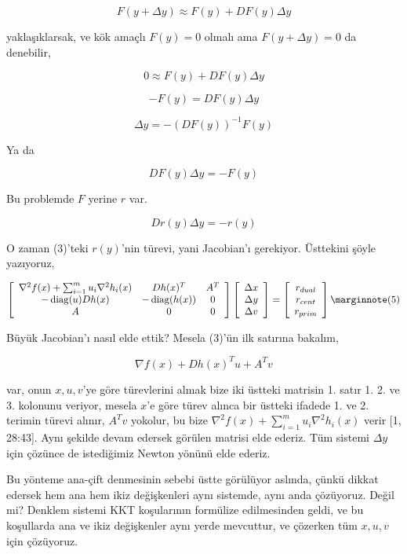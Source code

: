 \documentclass[12pt,fleqn]{article}\usepackage{../../common}
\begin{document}
$$
F(y + \Delta y) \approx F(y) + D F(y) \Delta y
$$

yaklaşıklarsak, ve kök amaçlı $F(y)=0$ olmalı ama $F(y + \Delta y) = 0$ da
denebilir,

$$
0 \approx F(y) + D F(y) \Delta y
$$

$$
-F(y) =  D F(y) \Delta y
$$

$$
\Delta y = -(DF(y))^{-1} F(y) 
$$

Ya da

$$
DF(y) \Delta y = -F(y) 
$$

Bu problemde $F$ yerine $r$ var. 

$$
D r(y) \Delta y = -r(y) 
$$

O zaman (3)'teki $r(y)$'nin türevi, yani Jacobian'ı gerekiyor. Üsttekini
şöyle yazıyoruz, 

$$
\left[\begin{array}{ccc}
\nabla^2 f(x) + \sum _{i=1}^{m} u_i \nabla^2 h_i(x) & D h(x)^T & A^T \\
-\diag(u) D h(x) & -\diag(h(x)) & 0 \\
A & 0 & 0
\end{array}\right]
\left[\begin{array}{c}
\Delta x \\ \Delta y \\ \Delta v
\end{array}\right] = 
\left[\begin{array}{c}
r_{dual} \\ r_{cent} \\ r_{prim}
\end{array}\right]  
\mlabel{5}
$$

Büyük Jacobian'ı nasıl elde ettik? Mesela (3)'ün ilk satırına bakalım, 

$$
\nabla f(x) + Dh(x)^T u + A^T v 
$$

var, onun $x,u,v$'ye göre türevlerini almak bize iki üstteki matrisin
1. satır 1. 2. ve 3. kolonunu veriyor, mesela $x$'e göre türev alınca bir
üstteki ifadede 1. ve 2. terimin türevi alınır, $A^T v $ yokolur, bu bize
$\nabla^2 f(x) + \sum _{i=1}^{m} u_i \nabla^2 h_i(x)$ verir [1, 28:43].
Aynı şekilde devam edersek görülen matrisi elde ederiz. Tüm sistemi
$\Delta y$ için çözünce de istediğimiz Newton yönünü elde ederiz.

Bu yönteme ana-çift denmesinin sebebi üstte görülüyor aslında, çünkü dikkat
edersek hem ana hem ikiz değişkenleri aynı sistemde, aynı anda
çözüyoruz. Değil mi? Denklem sistemi KKT koşularının formülize edilmesinden
geldi, ve bu koşullarda ana ve ikiz değişkenler aynı yerde mevcuttur, ve
çözerken tüm $x,u,v$ için çözüyoruz. 
\end{document}
